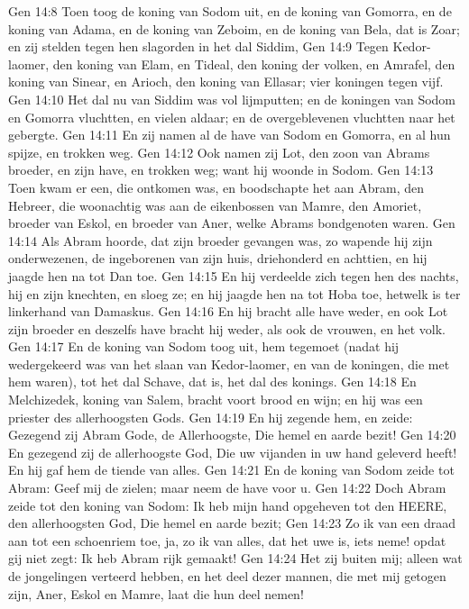 Gen 14:8  Toen toog de koning van Sodom uit, en de koning van Gomorra, en de koning van Adama, en de koning van Zeboim, en de koning van Bela, dat is Zoar; en zij stelden tegen hen slagorden in het dal Siddim,
Gen 14:9  Tegen Kedor-laomer, den koning van Elam, en Tideal, den koning der volken, en Amrafel, den koning van Sinear, en Arioch, den koning van Ellasar; vier koningen tegen vijf.
Gen 14:10  Het dal nu van Siddim was vol lijmputten; en de koningen van Sodom en Gomorra vluchtten, en vielen aldaar; en de overgeblevenen vluchtten naar het gebergte.
Gen 14:11  En zij namen al de have van Sodom en Gomorra, en al hun spijze, en trokken weg.
Gen 14:12  Ook namen zij Lot, den zoon van Abrams broeder, en zijn have, en trokken weg; want hij woonde in Sodom.
Gen 14:13  Toen kwam er een, die ontkomen was, en boodschapte het aan Abram, den Hebreer, die woonachtig was aan de eikenbossen van Mamre, den Amoriet, broeder van Eskol, en broeder van Aner, welke Abrams bondgenoten waren.
Gen 14:14  Als Abram hoorde, dat zijn broeder gevangen was, zo wapende hij zijn onderwezenen, de ingeborenen van zijn huis, driehonderd en achttien, en hij jaagde hen na tot Dan toe.
Gen 14:15  En hij verdeelde zich tegen hen des nachts, hij en zijn knechten, en sloeg ze; en hij jaagde hen na tot Hoba toe, hetwelk is ter linkerhand van Damaskus.
Gen 14:16  En hij bracht alle have weder, en ook Lot zijn broeder en deszelfs have bracht hij weder, als ook de vrouwen, en het volk.
Gen 14:17  En de koning van Sodom toog uit, hem tegemoet (nadat hij wedergekeerd was van het slaan van Kedor-laomer, en van de koningen, die met hem waren), tot het dal Schave, dat is, het dal des konings.
Gen 14:18  En Melchizedek, koning van Salem, bracht voort brood en wijn; en hij was een priester des allerhoogsten Gods.
Gen 14:19  En hij zegende hem, en zeide: Gezegend zij Abram Gode, de Allerhoogste, Die hemel en aarde bezit!
Gen 14:20  En gezegend zij de allerhoogste God, Die uw vijanden in uw hand geleverd heeft! En hij gaf hem de tiende van alles.
Gen 14:21  En de koning van Sodom zeide tot Abram: Geef mij de zielen; maar neem de have voor u.
Gen 14:22  Doch Abram zeide tot den koning van Sodom: Ik heb mijn hand opgeheven tot den HEERE, den allerhoogsten God, Die hemel en aarde bezit;
Gen 14:23  Zo ik van een draad aan tot een schoenriem toe, ja, zo ik van alles, dat het uwe is, iets neme! opdat gij niet zegt: Ik heb Abram rijk gemaakt!
Gen 14:24  Het zij buiten mij; alleen wat de jongelingen verteerd hebben, en het deel dezer mannen, die met mij getogen zijn, Aner, Eskol en Mamre, laat die hun deel nemen!
